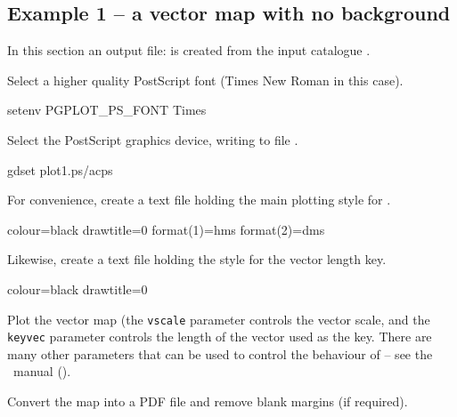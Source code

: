 \subsection{ Example 1 -- a vector map with no background}
\label{section:kappa-example1}

In this section an output file:  is created from the input
catalogue .

Select a higher quality PostScript font (Times New Roman in this case).

\begin{terminalv}
setenv PGPLOT_PS_FONT Times
\end{terminalv}

Select the PostScript graphics device, writing to file .

\begin{terminalv}
gdset plot1.ps/acps
\end{terminalv}

For convenience, create a text file holding the main plotting style for
.

\begin{terminalv}
colour=black
drawtitle=0
format(1)=hms
format(2)=dms
\end{terminalv}

Likewise, create a text file holding the style for the vector length
key.

\begin{terminalv}
colour=black
drawtitle=0
\end{terminalv}


Plot the vector map (the \texttt{vscale} parameter controls the vector
scale, and the \texttt{keyvec} parameter controls the length of the
vector used as the key. There are many other parameters that can be
used to control the behaviour of  -- see the \polpack\
manual ().

\begin{terminalv}
\end{terminalv}

Convert the map into a PDF file and remove blank margins (if required).

\begin{terminalv}
\end{terminalv}


